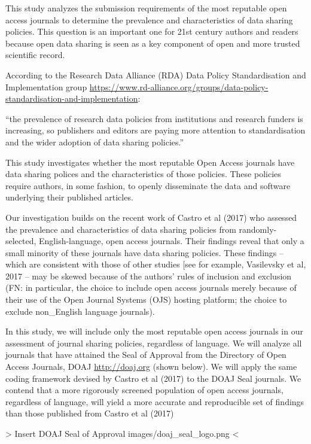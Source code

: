 \documentclass[]{article}
\begin{document}
This study analyzes the submission requirements of the most reputable
open access journals to determine the prevalence and characteristics of
data sharing policies. This question is an important one for 21st
century authors and readers because open data sharing is seen as a key
component of open and more trusted scientific record.

According to the Research Data Alliance (RDA) Data Policy
Standardisation and Implementation group
\url{https://www.rd-alliance.org/groups/data-policy-standardisation-and-implementation}:

``the prevalence of research data policies from institutions and
research funders is increasing, so publishers and editors are paying
more attention to standardisation and the wider adoption of data sharing
policies.''

This study investigates whether the most reputable Open Access journals
have data sharing polices and the characteristics of those policies.
These policies require authors, in some fashion, to openly disseminate
the data and software underlying their published articles.

Our investigation builds on the recent work of Castro et al (2017) who
assessed the prevalence and characteristics of data sharing policies
from randomly-selected, English-language, open access journals. Their
findings reveal that only a small minority of these journals have data
sharing policies. These findings -- which are consistent with those of
other studies {[}see for example, Vasilevsky et al, 2017 -- may be
skewed because of the authors' rules of inclusion and exclusion (FN: in
particular, the choice to include open access journals merely because of
their use of the Open Journal Systems (OJS) hosting platform; the choice
to exclude non\_English language journals).

In this study, we will include only the most reputable open access
journals in our assessment of journal sharing policies, regardless of
language. We will analyze all journals that have attained the Seal of
Approval from the Directory of Open Access Journals, DOAJ
\url{http://doaj.org} (shown below). We will apply the same coding
framework devised by Castro et al (2017) to the DOAJ Seal journals. We
contend that a more rigorously screened population of open access
journals, regardless of language, will yield a more accurate and
reproducible set of findings than those published from Castro et al
(2017)

\textbar{}\textbar{}\textgreater{} Insert DOAJ Seal of Approval
images/doaj\_seal\_logo.png \textless{}\textbar{}\textbar{}
\end{document}
